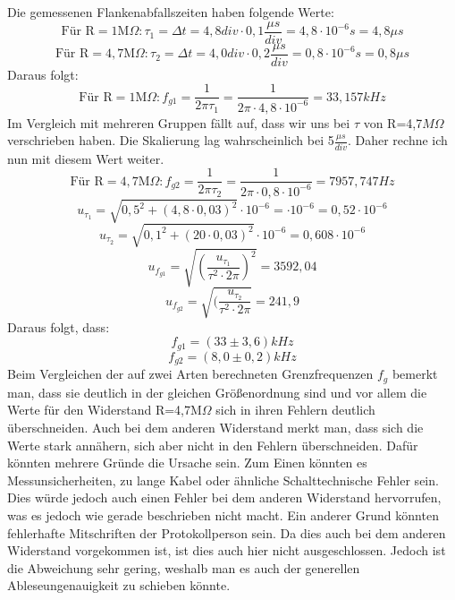  Die gemessenen Flankenabfallszeiten haben folgende Werte: \\
\begin{equation}
\text{Für R} =1\text{M}\Omega:\tau_1=\Delta t =4,8div \cdot 0,1\frac{\mu s}{div}=4,8\cdot10^{-6}s=4,8\mu s
\end{equation}
\begin{equation}
\text{Für R} =4,7\text{M} \Omega:\tau_2=\Delta t =4,0div \cdot 0,2\frac{\mu s}{div}=0,8\cdot10^{-6}s= 0,8 \mu s
\end{equation}
Daraus folgt:\\
\begin{equation}
\text{Für R} =1 \text{M} \Omega: f_{g1}=\frac{1}{2\pi \tau_1}= \frac{1}{2\pi \cdot 4,8\cdot 10^{-6}}=33,157kHz
\end{equation}
Im Vergleich mit mehreren Gruppen fällt auf, dass wir uns bei $\tau$ von R=4,7$M\Omega$ verschrieben haben. Die Skalierung lag wahrscheinlich bei 5$\frac{\mu s}{div}$. Daher rechne ich nun mit diesem Wert weiter. 
\begin{equation}
\text{Für R} =4,7 \text{M} \Omega: f_{g2}=\frac{1}{2\pi \tau_2}= \frac{1}{2\pi \cdot 0,8 \cdot 10^{-6}}=7957,747Hz
\end{equation}
\begin{equation}
u_{\tau_1}=\sqrt{0,5^2+(4,8\cdot0,03)^2}\cdot10^{-6}=\cdot10^{-6}=0,52\cdot10^{-6}
\end{equation}
\begin{equation}
u_{\tau_2}=\sqrt{0,1^2+(20\cdot0,03)^2}\cdot10^{-6}=0,608\cdot10^{-6}
\end{equation}
\begin{equation}
u_{f_{g1}}=\sqrt{(\frac{u_{\tau_1}}{\tau^2 \cdot 2\pi})^2}= 3592,04
\end{equation}
\begin{equation}
u_{f_{g2}}=\sqrt{(\frac{u_{\tau_2}}{\tau^2 \cdot 2\pi}}= 241,9
\end{equation}
Daraus folgt, dass:
\begin{equation}
f_{g1}=(33\pm3,6)kHz
\end{equation}
\begin{equation}
f_{g2}=(8,0\pm0,2)kHz
\end{equation}
Beim Vergleichen der auf zwei Arten berechneten Grenzfrequenzen $f_g$ bemerkt man, dass sie deutlich in der gleichen Größenordnung sind und vor allem die Werte für den Widerstand R=4,7M$\Omega$ sich in ihren Fehlern deutlich überschneiden. Auch bei dem anderen Widerstand merkt man, dass sich die Werte stark annähern, sich aber nicht in den Fehlern überschneiden. Dafür könnten mehrere Gründe die Ursache sein. Zum Einen könnten es Messunsicherheiten, zu lange Kabel oder ähnliche Schalttechnische Fehler sein. Dies würde jedoch auch einen Fehler bei dem anderen Widerstand hervorrufen, was es jedoch wie gerade beschrieben nicht macht. Ein anderer Grund könnten fehlerhafte Mitschriften der Protokollperson sein. Da dies auch bei dem anderen Widerstand vorgekommen ist, ist dies auch hier nicht ausgeschlossen. Jedoch ist die Abweichung sehr gering, weshalb man es auch der generellen Ableseungenauigkeit zu schieben könnte. \\
